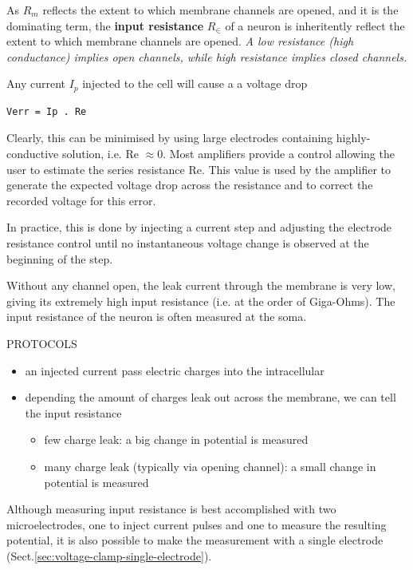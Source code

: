 As $R_m$ reflects the extent to which membrane channels are opened, and it is
the dominating term, the {\bf input resistance} $R_\in$ of a neuron is
inheritently reflect the extent to which membrane channels are opened. {\it A
low resistance (high conductance) implies open channels, while high resistance
implies closed channels.}


Any current $I_p$ injected to the cell will cause a a voltage drop 

 \begin{verbatim}
Verr = Ip . Re 
 \end{verbatim}
 
Clearly, this can be minimised by using large electrodes containing
highly-conductive solution, i.e. Re $\approx 0$.
Most amplifiers provide a control allowing  the  user  to  estimate  the  series
resistance Re.   This  value  is used  by the  amplifier  to  generate  the 
expected  voltage  drop  across  the  resistance and to correct the recorded
voltage for this error.

In practice, this is done by  injecting  a  current  step  and  adjusting  the
electrode  resistance control until no instantaneous voltage change is observed
at the beginning of the step.


Without any channel open, the leak current through the membrane is very low,
giving its extremely high input resistance (i.e. at the order of Giga-Ohms).
The input resistance of the neuron is often measured at the soma. 

PROTOCOLS
\begin{itemize}
  \item an injected current pass electric charges into the intracellular
  \item depending the amount of charges leak out across the membrane, we can
  tell the input resistance
  \begin{itemize}
    \item few charge leak: a big change in potential is measured
    \item many charge leak (typically via opening channel): a small change in
    potential is measured
  \end{itemize}
\end{itemize}
Although measuring input resistance is best accomplished with two
microelectrodes, one to inject current pulses and one to measure the resulting
potential, it is also possible to make the measurement with a single electrode
(Sect.\ref{sec:voltage-clamp-single-electrode}).

